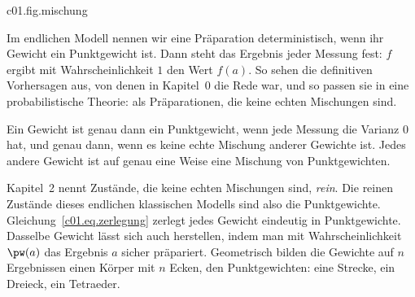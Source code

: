 \begin{tpcfigure}{c01.fig.mischung}

  \caption{Die Konstruktion aus Gleichung~\eqref{c01.eq.echte-mischung} für den gezinkten
    Würfel $\pw$ aus Gleichung~\eqref{c01.eq.gezinkt}, mit $a = 6$, $b = 1$ und
    $\varepsilon = \tfrac{1}{12}$. Von $\pw$ aus (links) wird das Gewicht $\tfrac{1}{12}$
    einmal von $1$ nach $6$ verschoben (Mitte, $q$) und einmal von $6$ nach $1$ (rechts,
    $r$); die veränderten Balken sind schraffiert. Hier ist $r$ der faire Würfel. Der gezinkte Würfel
    ist die Mischung $\pw = \tfrac12 q + \tfrac12 r$ und deshalb kein Punktgewicht.}
\end{tpcfigure}

Im endlichen Modell nennen wir eine Präparation deterministisch, wenn ihr Gewicht ein
Punktgewicht ist. Dann steht das Ergebnis jeder Messung fest: $f$ ergibt mit
Wahrscheinlichkeit $1$ den Wert $f(a)$. So sehen die definitiven Vorhersagen aus, von denen
in Kapitel~0 die Rede war, und so passen sie in eine probabilistische Theorie: als
Präparationen, die keine echten Mischungen sind.

\begin{merksatz}[Merksatz]
  Ein Gewicht ist genau dann ein Punktgewicht, wenn jede Messung die Varianz $0$ hat, und
  genau dann, wenn es keine echte Mischung anderer Gewichte ist. Jedes andere Gewicht ist
  auf genau eine Weise eine Mischung von Punktgewichten.
\end{merksatz}

Kapitel~2 nennt Zustände, die keine echten Mischungen sind, \emph{rein}. Die reinen
Zustände dieses endlichen klassischen Modells sind also die Punktgewichte.
Gleichung~\eqref{c01.eq.zerlegung} zerlegt jedes Gewicht eindeutig in Punktgewichte.
Dasselbe Gewicht lässt sich auch herstellen, indem man mit Wahrscheinlichkeit $\pw(a)$ das
Ergebnis $a$ sicher präpariert.
Geometrisch bilden die Gewichte auf $n$ Ergebnissen einen Körper mit $n$ Ecken, den
Punktgewichten: eine Strecke, ein Dreieck, ein Tetraeder.

